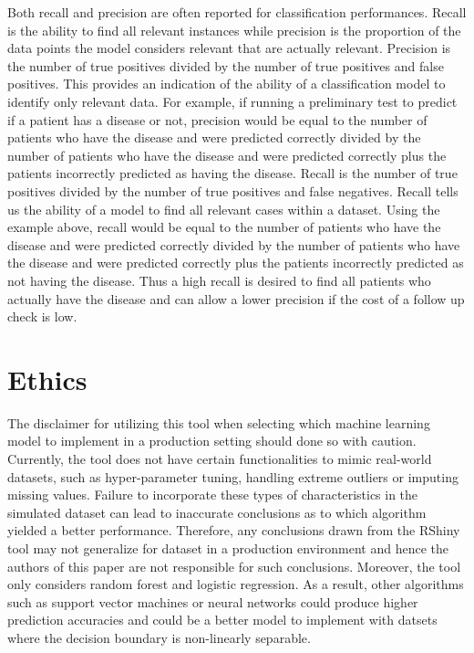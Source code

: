 \documentclass{llncs}
\begin{document}
Both recall and precision are often reported for classification performances.  Recall is the ability to find all relevant instances while precision is the proportion of the data points the model considers relevant that are actually relevant.  Precision is the number of true positives divided by the number of true positives and false positives.  This provides an indication of the ability of a classification model to identify only relevant data.  For example, if running a preliminary test to predict if a patient has a disease or not, precision would be equal to the number of patients who have the disease and were predicted correctly divided by the number of patients who have the disease and were predicted correctly plus the patients incorrectly predicted as having the disease.  Recall is the number of true positives divided by the number of true positives and false negatives. Recall tells us the ability of a model to find all relevant cases within a dataset.  Using the example above, recall would be equal to the number of patients who have the disease and were predicted correctly divided by the number of patients who have the disease and were predicted correctly plus the patients incorrectly predicted as not having the disease. Thus a high recall is desired to find all patients who actually have the disease and can allow a lower precision if the cost of a follow up check is low.


\section{Ethics}

The disclaimer for utilizing this tool when selecting which machine learning model to implement in a production setting should done so with caution. Currently, the tool does not have certain functionalities to mimic real-world datasets, such as hyper-parameter tuning, handling extreme outliers or imputing missing values. Failure to incorporate these types of characteristics in the simulated dataset can lead to inaccurate conclusions as to which algorithm yielded a better performance. Therefore, any conclusions drawn from the RShiny tool may not generalize for dataset in a production environment and hence the authors of this paper are not responsible for such conclusions. Moreover, the tool only considers random forest and logistic regression. As a result, other algorithms such as support vector machines or neural networks could produce higher prediction accuracies and could be a better model to implement with datsets where the decision boundary is non-linearly separable. 
\end{document}
